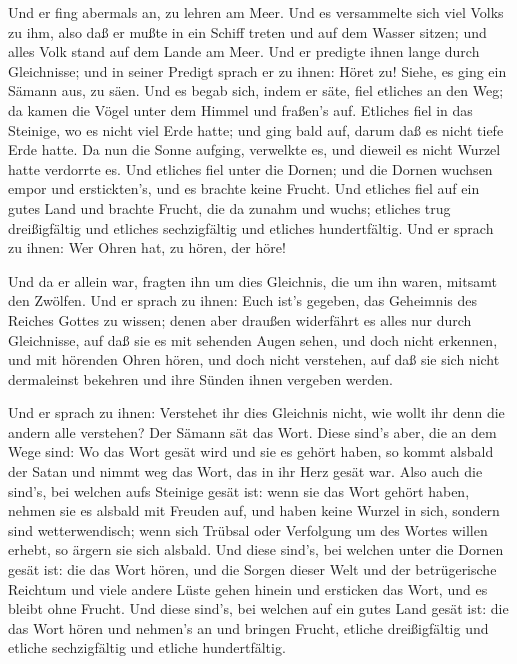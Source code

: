  Und er fing abermals an, zu lehren am Meer. Und es
versammelte sich viel Volks zu ihm, also daß er mußte in ein Schiff
treten und auf dem Wasser sitzen; und alles Volk stand auf dem Lande am
Meer.  Und er predigte ihnen lange durch Gleichnisse; und in
seiner Predigt sprach er zu ihnen:  Höret zu! Siehe, es ging
ein Sämann aus, zu säen.  Und es begab sich, indem er säte,
fiel etliches an den Weg; da kamen die Vögel unter dem Himmel und
fraßen's auf.  Etliches fiel in das Steinige, wo es nicht
viel Erde hatte; und ging bald auf, darum daß es nicht tiefe Erde hatte.
 Da nun die Sonne aufging, verwelkte es, und dieweil es
nicht Wurzel hatte verdorrte es.  Und etliches fiel unter
die Dornen; und die Dornen wuchsen empor und erstickten's, und es
brachte keine Frucht.  Und etliches fiel auf ein gutes Land
und brachte Frucht, die da zunahm und wuchs; etliches trug dreißigfältig
und etliches sechzigfältig und etliches hundertfältig.  Und
er sprach zu ihnen: Wer Ohren hat, zu hören, der höre!

 Und da er allein war, fragten ihn um dies Gleichnis, die
um ihn waren, mitsamt den Zwölfen.  Und er sprach zu ihnen:
Euch ist's gegeben, das Geheimnis des Reiches Gottes zu wissen; denen
aber draußen widerfährt es alles nur durch Gleichnisse, 
auf daß sie es mit sehenden Augen sehen, und doch nicht erkennen, und
mit hörenden Ohren hören, und doch nicht verstehen, auf daß sie sich
nicht dermaleinst bekehren und ihre Sünden ihnen vergeben werden.

 Und er sprach zu ihnen: Verstehet ihr dies Gleichnis
nicht, wie wollt ihr denn die andern alle verstehen?  Der
Sämann sät das Wort.  Diese sind's aber, die an dem Wege
sind: Wo das Wort gesät wird und sie es gehört haben, so kommt alsbald
der Satan und nimmt weg das Wort, das in ihr Herz gesät war.
 Also auch die sind's, bei welchen aufs Steinige gesät ist:
wenn sie das Wort gehört haben, nehmen sie es alsbald mit Freuden auf,
 und haben keine Wurzel in sich, sondern sind
wetterwendisch; wenn sich Trübsal oder Verfolgung um des Wortes willen
erhebt, so ärgern sie sich alsbald.  Und diese sind's, bei
welchen unter die Dornen gesät ist: die das Wort hören, 
und die Sorgen dieser Welt und der betrügerische Reichtum und viele
andere Lüste gehen hinein und ersticken das Wort, und es bleibt ohne
Frucht.  Und diese sind's, bei welchen auf ein gutes Land
gesät ist: die das Wort hören und nehmen's an und bringen Frucht,
etliche dreißigfältig und etliche sechzigfältig und etliche
hundertfältig.

